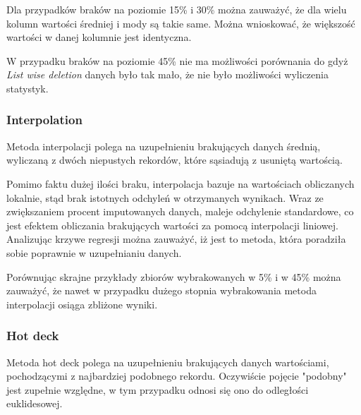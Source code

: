 \documentclass{classrep}
\begin{document}
{{            Dla przypadków braków na poziomie 15\% i 30\% można zauważyć, że dla wielu 
            kolumn wartości średniej i mody są takie same. Można wnioskować, że większość wartości w danej kolumnie jest identyczna.
            
            W przypadku braków na poziomie 45\% nie ma możliwości porównania do 
            gdyż \textit{List wise deletion} danych było tak mało, że nie było możliwości 
            wyliczenia statystyk.
        }

        \subsubsection{Interpolation}
        \label{summary:interpolation} {
            Metoda interpolacji polega na uzupełnieniu brakujących danych średnią, wyliczaną z dwóch niepustych rekordów, które sąsiadują z usuniętą wartością.

            Pomimo faktu dużej ilości braku, interpolacja bazuje na wartościach obliczanych lokalnie, stąd brak istotnych odchyleń w otrzymanych wynikach. Wraz ze zwiększaniem procent imputowanych danych, maleje odchylenie standardowe, co jest efektem obliczania brakujących wartości za pomocą interpolacji liniowej. Analizując krzywe regresji można zauważyć, iż jest to metoda, która poradziła sobie poprawnie w uzupełnianiu danych. 

            Porównując skrajne przykłady zbiorów wybrakowanych w 5\% i w 45\% można zauważyć, że nawet w przypadku dużego stopnia wybrakowania metoda interpolacji osiąga zbliżone wyniki.
        }

        \subsubsection{Hot deck}
        \label{summary:dot-deck} {
            Metoda hot deck polega na uzupełnieniu brakujących danych wartościami, pochodzącymi z najbardziej
            podobnego rekordu. Oczywiście pojęcie "podobny" jest zupełnie względne, w tym przypadku odnosi się ono
            do odległości euklidesowej.
            
}}
\end{document}
